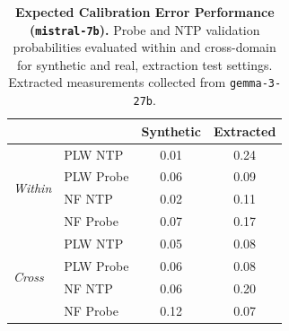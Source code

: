 \begin{table}[ht]
\centering
\begin{tabular}{ll cc}
\toprule
& & Synthetic & Extracted \\
\midrule
\multirow{4}{*}{\textit{Within}}
& PLW NTP & 0.01 & 0.24 \\
& PLW Probe & 0.06 & 0.09 \\
& NF NTP & 0.02 & 0.11 \\
& NF Probe & 0.07 & 0.17 \\
\midrule
\multirow{4}{*}{\textit{Cross}}
& PLW NTP & 0.05 & 0.08 \\
& PLW Probe & 0.06 & 0.08 \\
& NF NTP & 0.06 & 0.20 \\
& NF Probe & 0.12 & 0.07 \\
\bottomrule
\end{tabular}
\caption{\textbf{Expected Calibration Error Performance (\texttt{mistral-7b}).} Probe and NTP validation probabilities evaluated within and cross-domain for synthetic and real, extraction test settings. Extracted measurements collected from \texttt{gemma-3-27b}.}
\label{tab:mistral-7b-gemma-3-27b}
\end{table}

